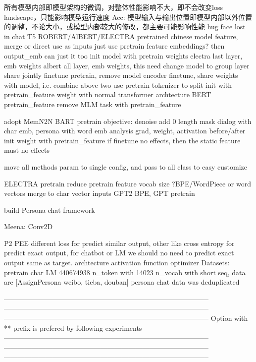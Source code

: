 \documentclass[letterpaper]{article} %
\begin{document}
\begin{CJK*}{UTF8}{gbsn}
      所有模型内部即模型架构的微调，对整体性能影响不大，即不会改变loss landscape，只能影响模型运行速度
  Acc:
      模型输入与输出位置即模型内部以外位置的调整，不论大小，或模型内部较大的修改，都主要可能影响性能
      hug face
      lost in chat
      T5
      ROBERT/AlBERT/ELECTRA pretrained chinese model feature, merge or direct use as inputs
      just use pretrain feature embeddings? then output_emb can just it too
      init model with pretrain weights
        electra last layer, emb weights
        albert all layer, emb weights, this need change model to group layer share
      jointly finetune pretrain, remove model encoder
      finetune, share weights with model, i.e. combine above two
      use pretrain tokenizer to split
      init with pretrain_feature weight with normal transformer archtecture
      BERT pretrain_feature
      remove MLM task with pretrain_feature

      adopt MemN2N 
      BART pretrain objective: denoise add 0 length mask
      dialog with char emb, persona with word emb
      analysis grad, weight, activation before/after init weight with pretrain_feature 
        if finetune no effects, then the static feature must no effects

      move all methods param to single config, and pass to all class to easy customize

      ELECTRA pretrain
      reduce pretrain feature vocab size
      ?BPE/WordPiece or word vectors merge to char vector inputs
      GPT2 BPE, GPT pretrain

      build Persona chat framework

      Meena: Conv2D

      P2
      PEE
      different loss for predict similar output, 
        other like cross entropy for predict exact output,
        for chatbot or LM we should no need to predict exact output same as target. 
      archtecture
      activation function
      optimizer
  Datasets:
      pretrain char LM 440674938 n_token with 14023 n_vocab with short seq, data are [AssignPersona weibo, tieba, douban]
      persona chat data was deduplicated 

-----------------------------------------------------------------------------------------
-----------------------------------------------------------------------------------------
-----------------------------------------------------------------------------------------
Option with ** prefix is prefered by following experiments
-----------------------------------------------------------------------------------------
-----------------------------------------------------------------------------------------
-----------------------------------------------------------------------------------------


\end{CJK*}
\end{document}
